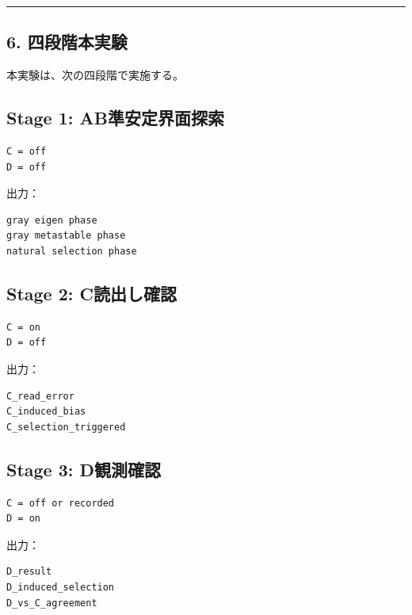 \documentclass{article}
\begin{document}
\begin{center}\rule{0.5\linewidth}{0.5pt}\end{center}

\subsection{6. 四段階本実験}\label{ux56dbux6bb5ux968eux672cux5b9fux9a13}

本実験は、次の四段階で実施する。

\subsection{Stage 1:
AB準安定界面探索}\label{stage-1-abux6e96ux5b89ux5b9aux754cux9762ux63a2ux7d22}

\begin{verbatim}
C = off
D = off
\end{verbatim}

出力：

\begin{verbatim}
gray eigen phase
gray metastable phase
natural selection phase
\end{verbatim}

\subsection{Stage 2:
C読出し確認}\label{stage-2-cux8aadux51faux3057ux78baux8a8d}

\begin{verbatim}
C = on
D = off
\end{verbatim}

出力：

\begin{verbatim}
C_read_error
C_induced_bias
C_selection_triggered
\end{verbatim}

\subsection{Stage 3: D観測確認}\label{stage-3-dux89b3ux6e2cux78baux8a8d}

\begin{verbatim}
C = off or recorded
D = on
\end{verbatim}

出力：

\begin{verbatim}
D_result
D_induced_selection
D_vs_C_agreement
\end{verbatim}
\end{document}
